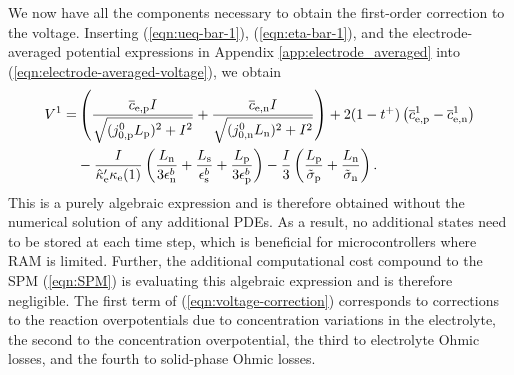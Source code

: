 \documentclass[a4paper]{article}
\newcommand{\ts}[1]{_{\text{#1}}}
\newcommand{\mybar}{\overline}
\begin{document}
We now have all the components necessary to obtain the first-order correction to the voltage. Inserting (\ref{eqn:ueq-bar-1}), (\ref{eqn:eta-bar-1}), and the electrode-averaged potential expressions in Appendix \ref{app:electrode_averaged} into (\ref{eqn:electrode-averaged-voltage}), we obtain
\begin{equation}\label{eqn:voltage-correction}
  \begin{aligned}
	V^1 = & \left(\frac{\mybar{c}\ts{e,p}I}{\sqrt{\big. \smash[b]{(j\ts{0,p}^0L\ts{p})^2 + I^2}}} 
          + \frac{\mybar{c}\ts{e,n}I}{\sqrt{\big. (j\ts{0,n}^0L\ts{n})^2 + I^2}} \right)
           + 2(1-t^+)\left(\mybar{c}\ts{e,p}^1 - \mybar{c}\ts{e,n}^1\right) \\
	      & -\frac{I}{\hat{\kappa}\ts{e}' \kappa\ts{e}(1)}\left(\frac{L\ts{n}}{3\epsilon\ts{n}^b} + \frac{L\ts{s}}{\epsilon\ts{s}^b} + \frac{L\ts{p}}{3\epsilon\ts{p}^b} \right)
         - \frac{I}{3}\left(\frac{L\ts{p}}{\tilde{\sigma}\ts{p}} 
        + \frac{L\ts{n}}{\tilde{\sigma}\ts{n}}\right).
  \end{aligned}
\end{equation}
This is a purely algebraic expression and is therefore obtained without the numerical solution of any additional PDEs. As a result, no additional states need to be stored at each time step, which is beneficial for microcontrollers where RAM is limited. Further, the additional computational cost compound to the SPM (\ref{eqn:SPM}) is evaluating this algebraic expression and is therefore negligible. The first term of (\ref{eqn:voltage-correction}) corresponds to corrections to the reaction overpotentials due to concentration variations in the electrolyte, the second to the concentration overpotential, the third to electrolyte Ohmic losses, and the fourth to solid-phase Ohmic losses. 
\end{document}
